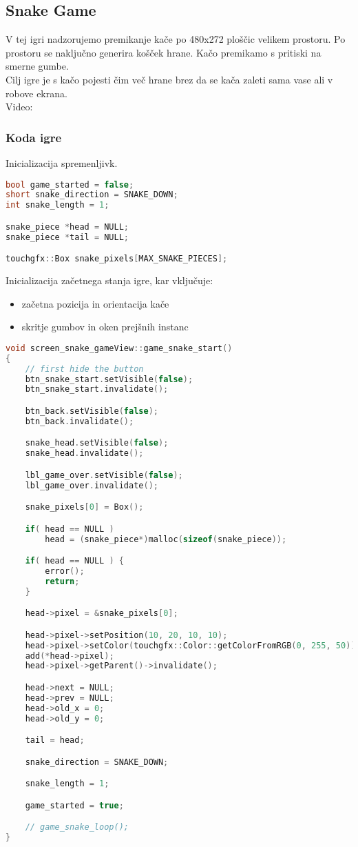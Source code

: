 \documentclass{article}
\begin{document}
\subsection{Snake Game}
\noindent
V tej igri nadzorujemo premikanje ka\v{c}e po 480x272 plo\v{s}\v{c}ic
velikem prostoru. Po prostoru se naklju\v{c}no generira ko\v{s}\v{c}ek
hrane. Ka\v{c}o premikamo s pritiski na smerne gumbe. \\

\noindent
Cilj igre je s ka\v{c}o pojesti \v{c}im ve\v{c} hrane brez da se ka\v{c}a
zaleti sama vase ali v robove ekrana. \\
Video:

\subsubsection{Koda igre}
\noindent
Inicializacija spremenljivk.
\begin{lstlisting}[language=c++]
bool game_started = false;
short snake_direction = SNAKE_DOWN;
int snake_length = 1;

snake_piece *head = NULL;
snake_piece *tail = NULL;

touchgfx::Box snake_pixels[MAX_SNAKE_PIECES];
\end{lstlisting}

\noindent
Inicializacija za\v{c}etnega stanja igre, kar vklju\v{c}uje:
\begin{itemize}
    \item za\v{c}etna pozicija in orientacija ka\v{c}e
    \item skritje gumbov in oken prej\v{s}nih instanc
\end{itemize}
\begin{lstlisting}[language=c++]
void screen_snake_gameView::game_snake_start()
{
	// first hide the button
	btn_snake_start.setVisible(false);
	btn_snake_start.invalidate();

	btn_back.setVisible(false);
	btn_back.invalidate();

	snake_head.setVisible(false);
	snake_head.invalidate();

	lbl_game_over.setVisible(false);
	lbl_game_over.invalidate();

	snake_pixels[0] = Box();

	if( head == NULL )
		head = (snake_piece*)malloc(sizeof(snake_piece));

	if( head == NULL ) {
		error();
		return;
	}

	head->pixel = &snake_pixels[0];

	head->pixel->setPosition(10, 20, 10, 10);
	head->pixel->setColor(touchgfx::Color::getColorFromRGB(0, 255, 50));
	add(*head->pixel);
	head->pixel->getParent()->invalidate();

	head->next = NULL;
	head->prev = NULL;
	head->old_x = 0;
	head->old_y = 0;

	tail = head;

	snake_direction = SNAKE_DOWN;

	snake_length = 1;

	game_started = true;

	// game_snake_loop();
}
\end{lstlisting}
\end{document}
